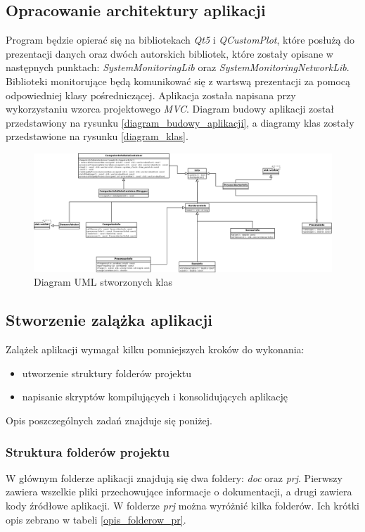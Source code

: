 \documentclass[a4paper]{article}
\begin{document}
\subsection{Opracowanie architektury aplikacji}
Program będzie opierać się na bibliotekach \textit{Qt5} i \textit{QCustomPlot}, które posłużą do prezentacji danych oraz dwóch autorskich bibliotek, które zostały opisane w następnych punktach: \textit{SystemMonitoringLib} oraz \textit{SystemMonitoringNetworkLib}. Biblioteki monitorujące będą komunikować się z wartswą prezentacji za pomocą odpowiedniej klasy pośredniczącej. Aplikacja została napisana przy wykorzystaniu wzorca projektowego \textit{MVC}. Diagram budowy aplikacji został przedstawiony na rysunku \ref{diagram_budowy_aplikacji}, a diagramy klas zostały przedstawione na rysunku \ref{diagram_klas}.



\begin{figure}[h]
	\centering
	\includegraphics[width=0.75\paperheight, angle=90]{img/diagramKlas.png}
	\caption{Diagram UML stworzonych klas}
\end{figure}


\subsection{Stworzenie zalążka aplikacji}

Zalążek aplikacji wymagał kilku pomniejszych kroków do wykonania:
\begin{itemize}
	\item utworzenie struktury folderów projektu
	\item napisanie skryptów kompilujących i konsolidujących aplikację
\end{itemize}
Opis poszczególnych zadań znajduje się poniżej.

\subsubsection{Struktura folderów projektu}
W głównym folderze aplikacji znajdują się dwa foldery: \textit{doc} oraz \textit{prj}. Pierwszy zawiera wszelkie pliki przechowujące informacje o dokumentacji, a drugi zawiera kody źródłowe aplikacji. W folderze \textit{prj} można wyróżnić kilka folderów. Ich krótki opis zebrano w tabeli \ref{opis_folderow_pr}.
\end{document}
